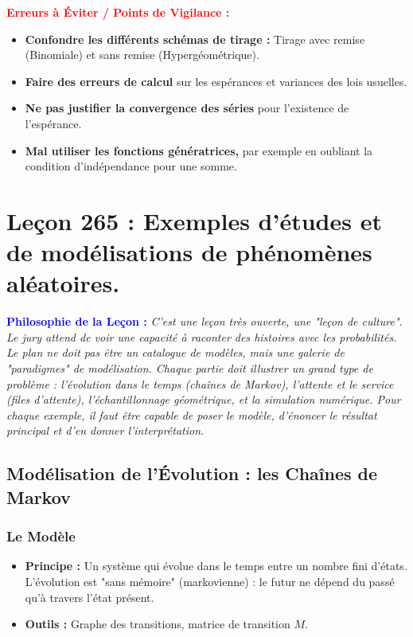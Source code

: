 \documentclass[12pt, a4paper, parskip=full]{report}
\theoremstyle{agregstyle}
\newenvironment{philosophie}
  {\par\medskip\noindent\begin{oframed}\noindent\textbf{\textcolor{blue}{Philosophie de la Leçon :}}\itshape}
  {\end{oframed}\par\medskip}
\newenvironment{erreurs}
  {\par\medskip\noindent\begin{oframed}\noindent\textbf{\textcolor{red}{Erreurs à Éviter / Points de Vigilance :}}}
  {\end{oframed}\par\medskip}
\begin{document}
\begin{erreurs}
    \begin{itemize}
        \item \textbf{Confondre les différents schémas de tirage :} Tirage avec remise (Binomiale) et sans remise (Hypergéométrique).
        \item \textbf{Faire des erreurs de calcul} sur les espérances et variances des lois usuelles.
        \item \textbf{Ne pas justifier la convergence des séries} pour l'existence de l'espérance.
        \item \textbf{Mal utiliser les fonctions génératrices,} par exemple en oubliant la condition d'indépendance pour une somme.
    \end{itemize}
\end{erreurs}
\chapter{Leçon 265 : Exemples d'études et de modélisations de phénomènes aléatoires.}

\begin{philosophie}
    C'est une leçon très ouverte, une "leçon de culture". Le jury attend de voir une capacité à raconter des histoires avec les probabilités. Le plan ne doit pas être un catalogue de modèles, mais une galerie de "paradigmes" de modélisation. Chaque partie doit illustrer un grand type de problème : l'évolution dans le temps (chaînes de Markov), l'attente et le service (files d'attente), l'échantillonnage géométrique, et la simulation numérique. Pour chaque exemple, il faut être capable de poser le modèle, d'énoncer le résultat principal et d'en donner l'interprétation.
\end{philosophie}

\section{Modélisation de l'Évolution : les Chaînes de Markov}
\subsection{Le Modèle}
\begin{itemize}
    \item \textbf{Principe :} Un système qui évolue dans le temps entre un nombre fini d'états. L'évolution est "sans mémoire" (markovienne) : le futur ne dépend du passé qu'à travers l'état présent.
    \item \textbf{Outils :} Graphe des transitions, matrice de transition $M$.
\end{itemize}
\end{document}
